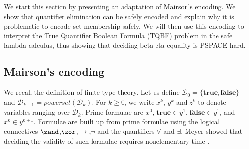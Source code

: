 We start this section by presenting an adaptation of Mairson's
encoding. We show that quantifier elimination can be safely encoded
and explain why it is problematic to encode set-membership safely.
We will then use this encoding to interpret the True Quantifier
Boolean Formula (TQBF) problem in the safe lambda calculus, thus
showing that deciding beta-eta equality is PSPACE-hard.

\subsection{Mairson's encoding}
\label{sec:mairsonenc} We recall the definition of finite type
theory. Let us define $\mathcal{D}_0 =
\{\mathbf{true},\mathbf{false}\}$ and $\mathcal{D}_{k+1}
=powerset(\mathcal{D}_k)$. For $k\geq0$, we write $x^k$, $y^k$ and
$z^k$ to denote variables ranging over $\mathcal{D}_k$. Prime
formulae are $x^0$, $\mathbf{true}\in y^1$, $\mathbf{false}\in y^1$,
and  $x^k \in y^{k+1}$. Formulae are built up from prime formulae
using the logical connectives $\zand$,$\zor$,$\rightarrow$,$\neg$
and the quantifiers $\forall$ and $\exists$. Meyer showed that
deciding the validity of such formulae requires nonelementary time
\cite{Meyer1974}.
\smallskip

